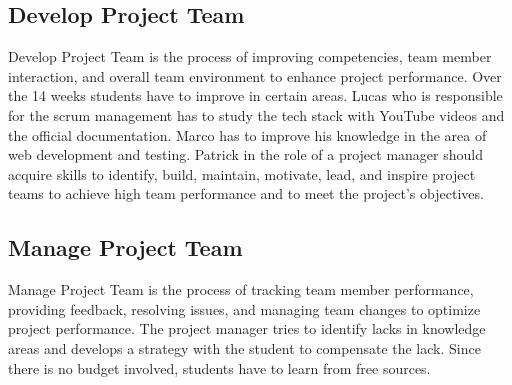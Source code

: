 \subsection{Develop Project Team}
Develop Project Team is the process of improving competencies, team member interaction, and overall team
environment to enhance project performance. Over the 14 weeks students have to improve in certain areas. Lucas who is responsible for the scrum management has to study the tech stack with YouTube videos and the official documentation. Marco has to improve his knowledge in the area of web development and testing. Patrick in the role of a project manager should acquire skills to identify, build, maintain, motivate, lead, and inspire project teams
to achieve high team performance and to meet the project’s objectives. 
\subsection{Manage Project Team}
Manage Project Team is the process of tracking team member performance, providing feedback, resolving
issues, and managing team changes to optimize project performance. The project manager tries to identify lacks in knowledge areas and develops a strategy with the student to compensate the lack. Since there is no budget involved, students have to learn from free sources.